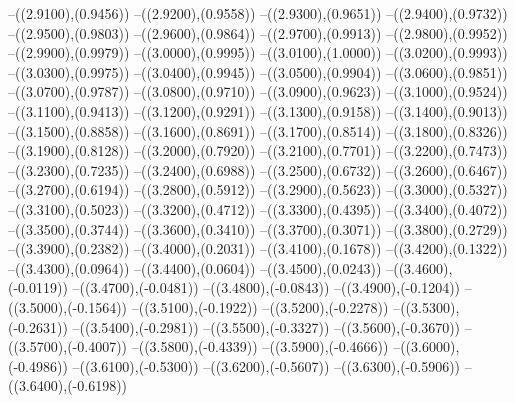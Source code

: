 {	--({\sx*(2.9100)},{\sy*(0.9456)})
	--({\sx*(2.9200)},{\sy*(0.9558)})
	--({\sx*(2.9300)},{\sy*(0.9651)})
	--({\sx*(2.9400)},{\sy*(0.9732)})
	--({\sx*(2.9500)},{\sy*(0.9803)})
	--({\sx*(2.9600)},{\sy*(0.9864)})
	--({\sx*(2.9700)},{\sy*(0.9913)})
	--({\sx*(2.9800)},{\sy*(0.9952)})
	--({\sx*(2.9900)},{\sy*(0.9979)})
	--({\sx*(3.0000)},{\sy*(0.9995)})
	--({\sx*(3.0100)},{\sy*(1.0000)})
	--({\sx*(3.0200)},{\sy*(0.9993)})
	--({\sx*(3.0300)},{\sy*(0.9975)})
	--({\sx*(3.0400)},{\sy*(0.9945)})
	--({\sx*(3.0500)},{\sy*(0.9904)})
	--({\sx*(3.0600)},{\sy*(0.9851)})
	--({\sx*(3.0700)},{\sy*(0.9787)})
	--({\sx*(3.0800)},{\sy*(0.9710)})
	--({\sx*(3.0900)},{\sy*(0.9623)})
	--({\sx*(3.1000)},{\sy*(0.9524)})
	--({\sx*(3.1100)},{\sy*(0.9413)})
	--({\sx*(3.1200)},{\sy*(0.9291)})
	--({\sx*(3.1300)},{\sy*(0.9158)})
	--({\sx*(3.1400)},{\sy*(0.9013)})
	--({\sx*(3.1500)},{\sy*(0.8858)})
	--({\sx*(3.1600)},{\sy*(0.8691)})
	--({\sx*(3.1700)},{\sy*(0.8514)})
	--({\sx*(3.1800)},{\sy*(0.8326)})
	--({\sx*(3.1900)},{\sy*(0.8128)})
	--({\sx*(3.2000)},{\sy*(0.7920)})
	--({\sx*(3.2100)},{\sy*(0.7701)})
	--({\sx*(3.2200)},{\sy*(0.7473)})
	--({\sx*(3.2300)},{\sy*(0.7235)})
	--({\sx*(3.2400)},{\sy*(0.6988)})
	--({\sx*(3.2500)},{\sy*(0.6732)})
	--({\sx*(3.2600)},{\sy*(0.6467)})
	--({\sx*(3.2700)},{\sy*(0.6194)})
	--({\sx*(3.2800)},{\sy*(0.5912)})
	--({\sx*(3.2900)},{\sy*(0.5623)})
	--({\sx*(3.3000)},{\sy*(0.5327)})
	--({\sx*(3.3100)},{\sy*(0.5023)})
	--({\sx*(3.3200)},{\sy*(0.4712)})
	--({\sx*(3.3300)},{\sy*(0.4395)})
	--({\sx*(3.3400)},{\sy*(0.4072)})
	--({\sx*(3.3500)},{\sy*(0.3744)})
	--({\sx*(3.3600)},{\sy*(0.3410)})
	--({\sx*(3.3700)},{\sy*(0.3071)})
	--({\sx*(3.3800)},{\sy*(0.2729)})
	--({\sx*(3.3900)},{\sy*(0.2382)})
	--({\sx*(3.4000)},{\sy*(0.2031)})
	--({\sx*(3.4100)},{\sy*(0.1678)})
	--({\sx*(3.4200)},{\sy*(0.1322)})
	--({\sx*(3.4300)},{\sy*(0.0964)})
	--({\sx*(3.4400)},{\sy*(0.0604)})
	--({\sx*(3.4500)},{\sy*(0.0243)})
	--({\sx*(3.4600)},{\sy*(-0.0119)})
	--({\sx*(3.4700)},{\sy*(-0.0481)})
	--({\sx*(3.4800)},{\sy*(-0.0843)})
	--({\sx*(3.4900)},{\sy*(-0.1204)})
	--({\sx*(3.5000)},{\sy*(-0.1564)})
	--({\sx*(3.5100)},{\sy*(-0.1922)})
	--({\sx*(3.5200)},{\sy*(-0.2278)})
	--({\sx*(3.5300)},{\sy*(-0.2631)})
	--({\sx*(3.5400)},{\sy*(-0.2981)})
	--({\sx*(3.5500)},{\sy*(-0.3327)})
	--({\sx*(3.5600)},{\sy*(-0.3670)})
	--({\sx*(3.5700)},{\sy*(-0.4007)})
	--({\sx*(3.5800)},{\sy*(-0.4339)})
	--({\sx*(3.5900)},{\sy*(-0.4666)})
	--({\sx*(3.6000)},{\sy*(-0.4986)})
	--({\sx*(3.6100)},{\sy*(-0.5300)})
	--({\sx*(3.6200)},{\sy*(-0.5607)})
	--({\sx*(3.6300)},{\sy*(-0.5906)})
	--({\sx*(3.6400)},{\sy*(-0.6198)})
}

